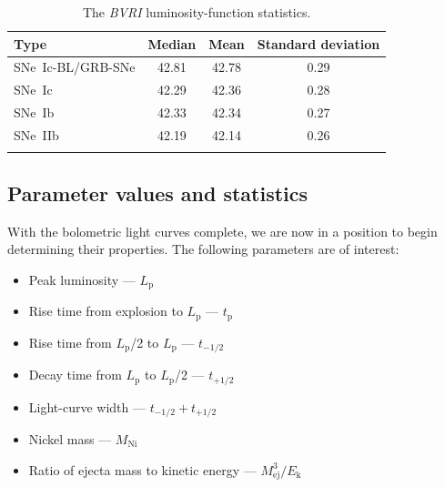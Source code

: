 \documentclass[a4paper,fleqn,usenatbib]{mnras}
\begin{document}
\begin{table}
 \centering
 \begin{minipage}{90mm}
  \caption{The \textit{BVRI} luminosity-function statistics.}
 \begin{tabular}{lccc}
  \hline
 Type & Median &Mean & Standard deviation \\
  \hline
SNe~Ic-BL/GRB-SNe & 42.81 &  42.78 & 0.29\\
SNe~Ic & 42.29 & 42.36 & 0.28 \\
SNe~Ib & 42.33 & 42.34 & 0.27 \\
SNe~IIb & 42.19 & 42.14 & 0.26\\
\hline
 \label{bollumfunc}
\end{tabular}
\end{minipage}
\end{table}


\subsection{Parameter values and statistics}
With the bolometric light curves complete, we are now in a position to begin determining their properties. The following parameters are of interest:
\begin{itemize}
	\item{Peak luminosity --- $L_{\mathrm{p}}$}
	\item{Rise time from explosion to $L_{\mathrm{p}}$ --- $t_{\mathrm{p}}$}
	\item{Rise time from $L_{\mathrm{p}}$/2 to $L_{\mathrm{p}}$ --- $t_{-1/2}$}
	\item{Decay time from $L_{\mathrm{p}}$ to $L_{\mathrm{p}}$/2 --- $t_{+1/2}$}
	\item{Light-curve width --- $t_{-1/2} + t_{+1/2}$}
	\item{Nickel mass --- $M_{\mathrm{Ni}}$}
	\item{Ratio of ejecta mass to kinetic energy --- $M_{\mathrm{ej}}^3/E_{\mathrm{k}}$}
\end{itemize}
\end{document}
